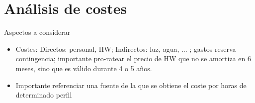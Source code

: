 \section{Análisis de costes}
\label{sec:planificacion}

{ \color{red} Aspectos a considerar
    \begin{itemize}
      \item Costes: Directos: personal, HW; Indirectos: luz, agua, ... ; gastos reserva contingencia; importante pro-ratear el precio de HW que no se amortiza en 6 meses, sino que es válido durante 4 o 5 años.
      \item Importante referenciar una fuente de la que se obtiene el coste por horas de determinado perfil
    \end{itemize}
}